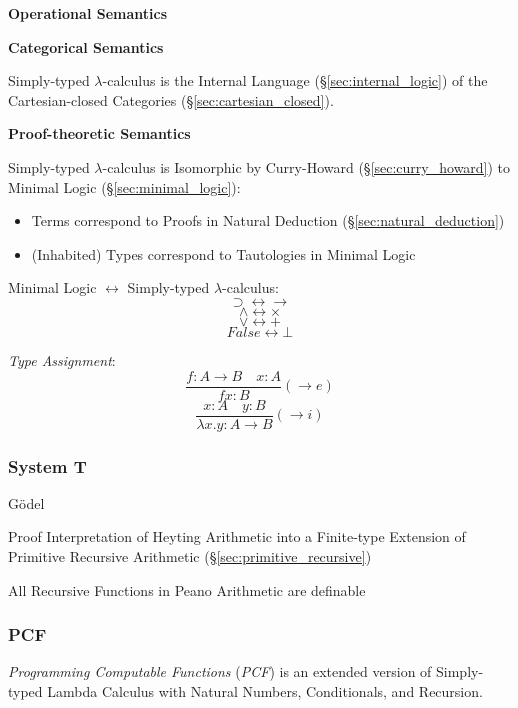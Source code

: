 \textbf{Operational Semantics}

\textbf{Categorical Semantics}

Simply-typed $\lambda$-calculus is the Internal Language
(\S\ref{sec:internal_logic}) of the Cartesian-closed Categories
(\S\ref{sec:cartesian_closed}).



\textbf{Proof-theoretic Semantics}

Simply-typed $\lambda$-calculus is Isomorphic by Curry-Howard
(\S\ref{sec:curry_howard}) to Minimal Logic
(\S\ref{sec:minimal_logic}):
\begin{itemize}
  \item Terms correspond to Proofs in Natural Deduction
    (\S\ref{sec:natural_deduction})
  \item (Inhabited) Types correspond to Tautologies in Minimal Logic
\end{itemize}



Minimal Logic $\leftrightarrow$ Simply-typed $\lambda$-calculus:
\[
  \supset \leftrightarrow \rightarrow
\] \[
  \wedge \leftrightarrow \times
\] \[
  \vee \leftrightarrow +
\] \[
  False \leftrightarrow \bot
\]



\emph{Type Assignment}:
\[
  \frac{
    f:A \rightarrow B \quad x:A
  }{
    f x : B
  }(\rightarrow e)
\]\[
  \frac{
    x:A \quad y:B
  }{
    \lambda x.y : A \rightarrow B
  }(\rightarrow i)
\]



\subsubsection{System T}\label{sec:system_t}

G\"odel

Proof Interpretation of Heyting Arithmetic into a Finite-type
Extension of Primitive Recursive Arithmetic
(\S\ref{sec:primitive_recursive})

All Recursive Functions in Peano Arithmetic are definable



\subsubsection{PCF}\label{sec:pcf}

\emph{Programming Computable Functions} (\emph{PCF}) is an extended
version of Simply-typed Lambda Calculus with Natural Numbers,
Conditionals, and Recursion.

